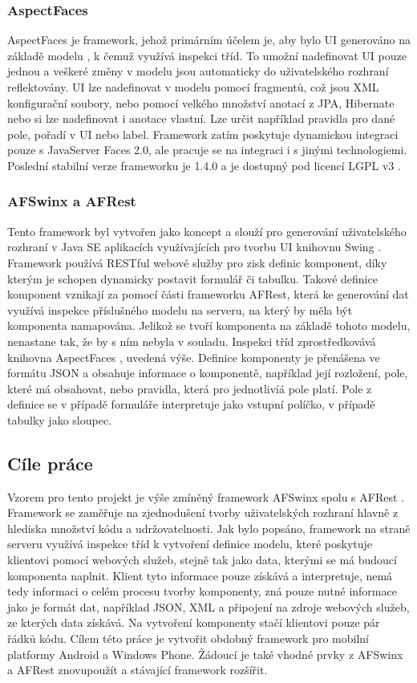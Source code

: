 \subsubsection{AspectFaces}
AspectFaces je framework, jehož primárním účelem je, aby bylo UI generováno na základě modelu \cite{aspectdriven}, k čemuž využívá inspekci tříd. To umožní nadefinovat UI pouze jednou a veškeré změny v modelu jsou automaticky do uživatelského rozhraní reflektovány. UI lze nadefinovat v modelu pomocí fragmentů, což jsou XML konfigurační soubory, nebo pomocí velkého množství anotací z JPA, Hibernate nebo si lze nadefinovat i anotace vlastní. Lze určit například pravidla pro dané pole, pořadí v UI nebo label. Framework zatím poskytuje dynamickou integraci pouze s JavaServer Faces 2.0, ale pracuje se na integraci i s jinými technologiemi. Poslední stabilní verze frameworku je 1.4.0 a je dostupný pod licencí LGPL v3 \cite{aspect-faces}.

\subsubsection{AFSwinx a AFRest}
Tento framework byl vytvořen jako koncept a slouží pro generování uživatelského rozhraní v Java SE aplikacích využívajících pro tvorbu UI knihovnu Swing \cite{tomasek-thesis}. Framework používá RESTful webové služby pro zisk definic komponent, díky kterým je schopen dynamicky postavit formulář či tabulku. Takové definice komponent vznikají za pomocí části frameworku AFRest, která ke generování dat využívá inspekce příslušného modelu na serveru, na který by měla být komponenta namapována. Jelikož se tvoří komponenta na základě tohoto modelu, nenastane tak, že by s ním nebyla v souladu. Inspekci tříd zprostředkovává knihovna AspectFaces \cite{aspect-faces}, uvedená výše. Definice komponenty je přenášena ve formátu JSON a obsahuje informace o komponentě, například její rozložení, pole, které má obsahovat, nebo pravidla, která pro jednotlivíá pole platí. Pole z definice se v případě formuláře interpretuje jako vstupní políčko, v případě tabulky jako sloupec. 

\subsection{Cíle práce}
Vzorem pro tento projekt je výše zmíněný framework AFSwinx spolu s AFRest \cite{tomasek-thesis}. Framework se zaměřuje na zjednodušení tvorby uživatelských rozhraní hlavně z hlediska množství kódu a udržovatelnosti. Jak bylo popsáno, framework na straně serveru využívá inspekce tříd k vytvoření definice modelu, které poskytuje klientovi pomocí webových služeb, stejně tak jako data, kterými se má budoucí komponenta naplnit. Klient tyto informace pouze získává a interpretuje, nemá tedy informaci o celém procesu tvorby komponenty, zná pouze nutné informace jako je formát dat, například JSON, XML a připojení na zdroje webových služeb, ze kterých data získává. Na vytvoření komponenty stačí klientovi pouze pár řádků kódu. Cílem této práce je vytvořit obdobný framework pro mobilní platformy Android a Windows Phone. Žádoucí je také vhodné prvky z AFSwinx a AFRest znovupoužít a stávající framework rozšířit.
